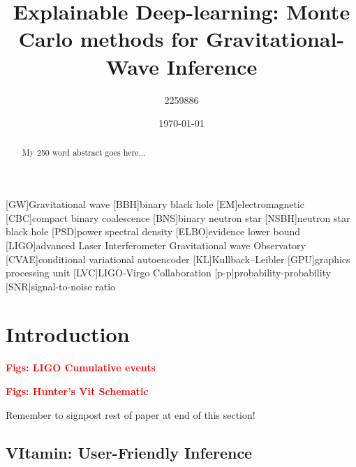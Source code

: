 \documentclass[aps,superscriptaddress,twocolumn,nopreprintnumbers,floatfix,groupedaddress]{revtex4-1}
\newcommand{\vitamin}{{\sc VItamin}\xspace}
\begin{document}
\title{Explainable Deep-learning: Monte Carlo methods for Gravitational-Wave Inference}

\author{2259886}
%

\date{\today}

\begin{abstract}
My 250 word abstract goes here...
\end{abstract}

\maketitle

[GW]{Gravitational wave}
[BBH]{binary black hole}
[EM]{electromagnetic}
[CBC]{compact binary coalescence}
[BNS]{binary neutron star}
[NSBH]{neutron star black hole}
[PSD]{power spectral density}
[ELBO]{evidence lower bound}
[LIGO]{advanced Laser Interferometer Gravitational wave Observatory}
[CVAE]{conditional variational autoencoder}
[KL]{Kullback--Leibler}
[GPU]{graphics processing unit}
[LVC]{LIGO-Virgo Collaboration}
[p-p]{probability-probability}
[SNR]{signal-to-noise ratio}

\section{Introduction}\label{intro}

\textbf{\textcolor{red}{Figs: LIGO Cumulative events}}

\textbf{\textcolor{red}{Figs: Hunter's Vit Schematic}}



Remember to signpost rest of paper at end of this section!

%
\subsection{\vitamin: User-Friendly Inference}\label{vit}
%
%
%
\end{document}
